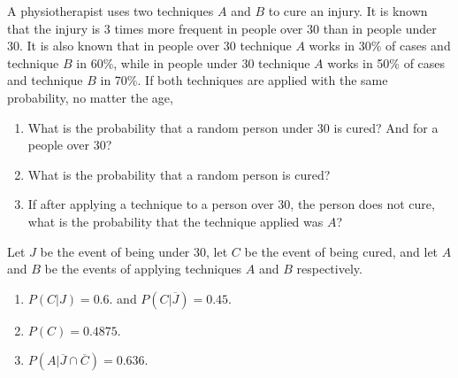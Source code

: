 {A physiotherapist uses two techniques $A$ and $B$ to cure an injury. 
It is known that the injury is 3 times more frequent in people over 30 than in people under 30. 
It is also known that in people over 30 technique $A$ works in 30\% of cases and technique $B$ in 60\%, while in people under 30 technique $A$ works in 50\% of cases and technique $B$ in 70\%.
If both techniques are applied with the same probability, no matter the age,
\begin{enumerate}
\item What is the probability that a random person under 30 is cured? And for a people over 30?
\item What is the probability that a random person is cured?
\item If after applying a technique to a person over 30, the person does not cure, what is the probability that the technique applied was $A$?
\end{enumerate}
} 
{Let $J$ be the event of being under 30, let $C$ be the event of being cured, and let $A$ and $B$ be the events of applying techniques $A$ and $B$ respectively.
\begin{enumerate}
\item $P(C|J)=0.6.$ and $P(C|\overline{J})=0.45$.
\item $P(C)=0.4875$.
\item $P(A|\overline{J}\cap \overline{C})=0.636$.
\end{enumerate}
}
